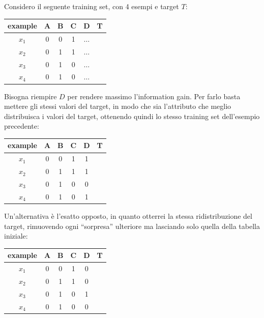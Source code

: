 \begin{esempio}
  Considero il seguente training set, con 4 esempi e target $T$:
  \begin{table}[H]
    \centering
    \begin{tabular}{c|c|c|c|c|c}
      example & A & B & C & D & T\\
      \hline
      $x_1$ & 0 & 0 & 1 & $\ldots$ & \color{darkgreen}{1}\\
      $x_2$ & 0 & 1 & 1 & $\ldots$ & \color{darkgreen}{1}\\
      $x_3$ & 0 & 1 & 0 & $\ldots$ & \color{red}{0}\\
      $x_4$ & 0 & 1 & 0 & $\ldots$ & \color{darkgreen}{1}\\
    \end{tabular}
  \end{table}
  Bisogna riempire $D$ per rendere massimo l'information gain.
  \newpage
  Per farlo basta mettere gli stessi valori del target, in modo che sia
  l'attributo che meglio distribuisca i valori del target, ottenendo quindi lo
  stesso training set dell'esempio precedente:
  \begin{table}[H]
    \centering
    \begin{tabular}{c|c|c|c|c|c}
      example & A & B & C & D & T\\
      \hline
      $x_1$ & 0 & 0 & 1 & 1 & \color{darkgreen}{1}\\
      $x_2$ & 0 & 1 & 1 & 1 & \color{darkgreen}{1}\\
      $x_3$ & 0 & 1 & 0 & 0 & \color{red}{0}\\
      $x_4$ & 0 & 1 & 0 & 1 & \color{darkgreen}{1}\\
    \end{tabular}
  \end{table}
  Un'alternativa è l'esatto opposto, in quanto otterrei la stessa
  ridistribuzione del target, rimuovendo ogni ``sorpresa'' ulteriore ma
  lasciando solo quella della tabella iniziale:
  \begin{table}[H]
    \centering
    \begin{tabular}{c|c|c|c|c|c}
      example & A & B & C & D & T\\
      \hline
      $x_1$ & 0 & 0 & 1 & 0 & \color{darkgreen}{1}\\
      $x_2$ & 0 & 1 & 1 & 0 & \color{darkgreen}{1}\\
      $x_3$ & 0 & 1 & 0 & 1 & \color{red}{0}\\
      $x_4$ & 0 & 1 & 0 & 0 & \color{darkgreen}{1}\\
    \end{tabular}
  \end{table}
\end{esempio}
